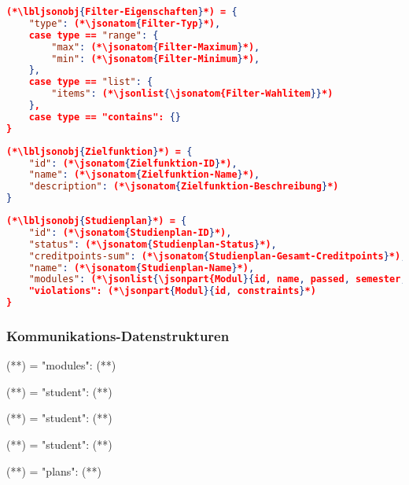 \begin{lstlisting}[language=json]
(*\lbljsonobj{Filter-Eigenschaften}*) = {
	"type": (*\jsonatom{Filter-Typ}*),
	case type == "range": {
		"max": (*\jsonatom{Filter-Maximum}*),
		"min": (*\jsonatom{Filter-Minimum}*),
	},
	case type == "list": {
		"items": (*\jsonlist{\jsonatom{Filter-Wahlitem}}*)
	},
	case type == "contains": {}
}
\end{lstlisting}

\begin{lstlisting}[language=json]
(*\lbljsonobj{Zielfunktion}*) = {
	"id": (*\jsonatom{Zielfunktion-ID}*),
	"name": (*\jsonatom{Zielfunktion-Name}*),
	"description": (*\jsonatom{Zielfunktion-Beschreibung}*)
}
\end{lstlisting}

\begin{lstlisting}[language=json]
(*\lbljsonobj{Studienplan}*) = {
    "id": (*\jsonatom{Studienplan-ID}*),
    "status": (*\jsonatom{Studienplan-Status}*),
    "creditpoints-sum": (*\jsonatom{Studienplan-Gesamt-Creditpoints}*),
    "name": (*\jsonatom{Studienplan-Name}*),
    "modules": (*\jsonlist{\jsonpart{Modul}{id, name, passed, semester, creditpoints, lecturer}}*)
    "violations": (*\jsonpart{Modul}{id, constraints}*)	
}
\end{lstlisting}

\subsubsection*{Kommunikations-Datenstrukturen}

\begin{json}
(**) = {
	"modules": (**)
}	
\end{json}

\begin{json}
(**) = {
	"student": (**)
}	
\end{json}

\begin{json}
(**) = {
	"student": (**)
}	
\end{json}

\begin{json}
(**) = {
	"student": (**)
}	
\end{json}

\begin{json}
(**) = {
	"plans": (**)
}	
\end{json}

